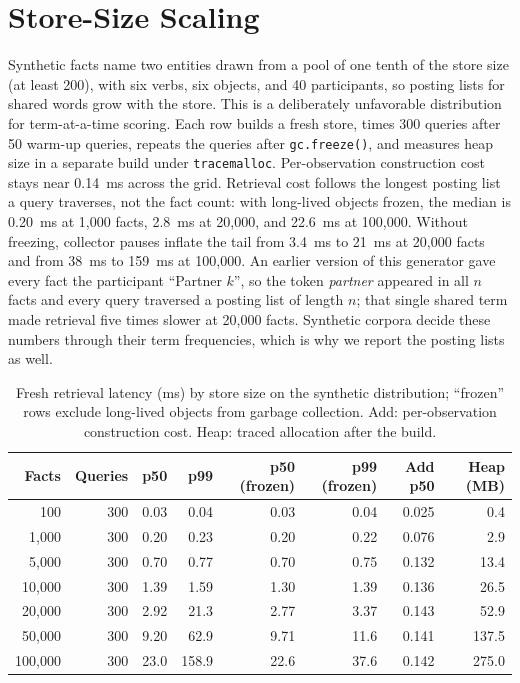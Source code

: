 \documentclass{article} %
\begin{document}
\section{Store-Size Scaling}
\label{app:scaling}

Synthetic facts name two entities drawn from a pool of one tenth of the store size (at least 200), with six verbs, six objects, and 40 participants, so posting lists for shared words grow with the store. This is a deliberately unfavorable distribution for term-at-a-time scoring. Each row builds a fresh store, times 300 queries after 50 warm-up queries, repeats the queries after \texttt{gc.freeze()}, and measures heap size in a separate build under \texttt{tracemalloc}. Per-observation construction cost stays near 0.14~ms across the grid. Retrieval cost follows the longest posting list a query traverses, not the fact count: with long-lived objects frozen, the median is 0.20~ms at 1{,}000 facts, 2.8~ms at 20{,}000, and 22.6~ms at 100{,}000. Without freezing, collector pauses inflate the tail from 3.4~ms to 21~ms at 20{,}000 facts and from 38~ms to 159~ms at 100{,}000. An earlier version of this generator gave every fact the participant ``Partner $k$'', so the token \emph{partner} appeared in all $n$ facts and every query traversed a posting list of length $n$; that single shared term made retrieval five times slower at 20{,}000 facts. Synthetic corpora decide these numbers through their term frequencies, which is why we report the posting lists as well.

\begin{table}[h]
\centering
\small
\begin{tabular}{@{}rrrrrrrr@{}}
\toprule
Facts & Queries & p50 & p99 & p50 (frozen) & p99 (frozen) & Add p50 & Heap (MB) \\
\midrule
100 & 300 & 0.03 & 0.04 & 0.03 & 0.04 & 0.025 & 0.4 \\
1{,}000 & 300 & 0.20 & 0.23 & 0.20 & 0.22 & 0.076 & 2.9 \\
5{,}000 & 300 & 0.70 & 0.77 & 0.70 & 0.75 & 0.132 & 13.4 \\
10{,}000 & 300 & 1.39 & 1.59 & 1.30 & 1.39 & 0.136 & 26.5 \\
20{,}000 & 300 & 2.92 & 21.3 & 2.77 & 3.37 & 0.143 & 52.9 \\
50{,}000 & 300 & 9.20 & 62.9 & 9.71 & 11.6 & 0.141 & 137.5 \\
100{,}000 & 300 & 23.0 & 158.9 & 22.6 & 37.6 & 0.142 & 275.0 \\
\bottomrule
\end{tabular}
\caption{Fresh retrieval latency (ms) by store size on the synthetic distribution; ``frozen'' rows exclude long-lived objects from garbage collection. Add: per-observation construction cost. Heap: traced allocation after the build.}
\label{tab:scaling}
\end{table}
\end{document}
